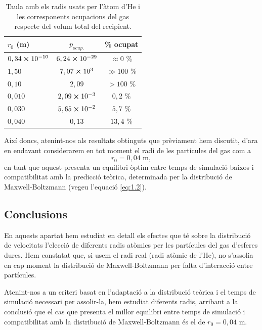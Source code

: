 \documentclass[a4paper,10.5pt]{report}
\begin{document}
\begin{table}[h]
	\centering
	\caption{Taula amb els radis usats per l'àtom d'He i les corresponents ocupacions del gas respecte del volum total del recipient.}
	\begin{tabular}{l c c}
		\toprule
		$r_0$ (m) & $p_{ocup.}$ & \% ocupat \\
		\midrule
		$0,34\cross10^{-10}$ & $6,24\cross10^{-29}$ & $\approx 0$ \% \\
		$1,50$   & $7,07\cross10^3$ & $\gg 100$ \%\\
		$0,10$   & $2,09$ & $> 100 $ \%\\
		$0,010$  & $2,09\cross10^{-3}$ & $0,2$ \%\\
		$0,030$  & $5,65\cross10^{-2}$ & $5,7$ \% \\ 
		$0,040$  & $0,13$ & $13,4$ \% \\
		\bottomrule
	\end{tabular}
	\label{tab:1.1}
\end{table}
 
Així doncs, atenint-nos als resultats obtinguts que prèviament hem discutit, d'ara en endavant considerarem en tot moment el radi de les partícules del gas com a 
\begin{equation*}
	\boxed{r_0 = 0,04 \text{ m}},
\end{equation*}
en tant que aquest presenta un equilibri òptim entre temps de simulació baixos i compatibilitat amb la predicció teòrica, determinada per la distribució de Maxwell-Boltzmann (vegeu l'equació \eqref{eq:1.2}).

\subsection{Conclusions}
En aquests apartat hem estudiat en detall els efectes que té sobre la distribució de velocitats l'elecció de diferents radis atòmics per les partícules del gas d'esferes dures. Hem constatat que, si usem el radi real (radi atòmic de l'He), no s'assolia en cap moment la distribució de Maxwell-Boltzmann per falta d'interacció entre partícules.

Atenint-nos a un criteri basat en l'adaptació a la distribució teòrica i el temps de simulació necessari per assolir-la, hem estudiat diferents radis, arribant a la conclusió que el cas que presenta el millor equilibri entre temps de simulació i compatibilitat amb la distribució de Maxwell-Boltzmann és el de $r_0 = 0,04$ m.
\end{document}
